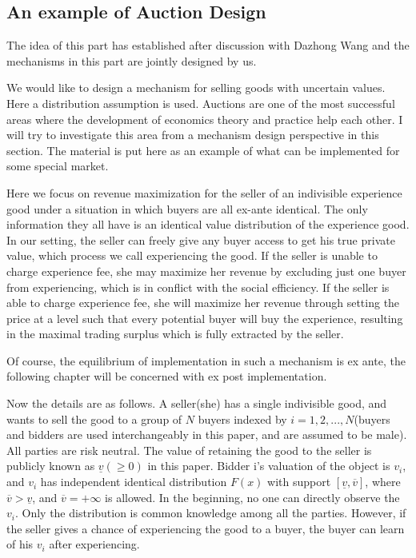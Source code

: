 
\subsection{An example of Auction Design}
The idea of this part has established after discussion with Dazhong Wang and the mechanisms in this part are jointly designed by us.

We would like to design a mechanism for selling goods with  uncertain values.
Here a distribution assumption is used. Auctions are one of the most successful areas where the development of economics
theory and practice help each other. I will try to investigate this area from
a mechanism design perspective in this section. The material is put here as an example of what can be implemented for some special market. 

Here we focus on revenue maximization for the seller of an indivisible experience
good under a situation in which buyers are all ex-ante identical. The only information they all have is an identical
value distribution of the experience good. In our
setting, the seller can freely give any buyer access to get his true private value, which process we call experiencing the good. If the seller is
unable to charge experience fee, she may maximize her revenue by excluding just one buyer from experiencing, which is in conflict with the social efficiency. If
the seller is able to charge experience fee, she will maximize her revenue through setting
the price at a level such that every potential buyer will buy the experience, 
resulting in the maximal trading surplus which is fully extracted by the seller.

Of course, the equilibrium of implementation in such a mechanism is ex ante,  the following chapter will be concerned with ex post implementation.

Now the details are as follows. A seller(she) has a single indivisible good, and wants to sell the good to a group of $N$ buyers indexed by $i=1, 2, . . . , N$(buyers and
bidders are used interchangeably in this paper, and are assumed to be
male). All parties are risk neutral. 
 The value of retaining the good to the seller
is publicly known as $\underline{v}(\geq 0)$ in this paper. Bidder i's valuation of the object
is $v_{i}$, and $v_{i}$ has independent identical distribution $F(x)$ with support $[\underline{v}, \overline{v}]$, 
where $\overline{v}>\underline{v}$, and $\overline{v}=+\infty$ is allowed. 
In the beginning, no one can directly observe the $v_{i}$. Only the distribution is common knowledge among all the parties. However, if the seller gives a chance of experiencing the good to a buyer, the buyer can learn of his $v_{i}$ after experiencing. 
 

